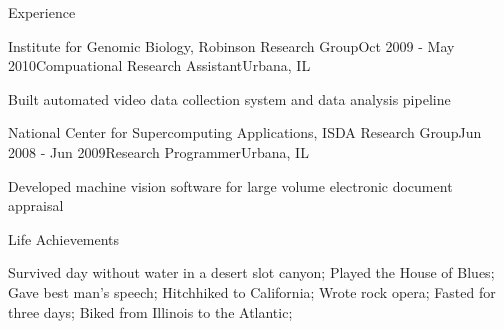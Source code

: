 \documentclass{resume} %
\begin{document}
\begin{rSection}{Experience}

\begin{rSubsection}{Institute for Genomic Biology, Robinson Research Group}{Oct 2009 - May 2010}{Compuational Research Assistant}{Urbana, IL}
\item Built automated video data collection system and data analysis pipeline

\end{rSubsection}


\begin{rSubsection}{National Center for Supercomputing Applications, ISDA Research Group}{Jun 2008 - Jun 2009}{Research Programmer}{Urbana, IL}
\item Developed machine vision software for large volume electronic document appraisal

\end{rSubsection}




\end{rSection}



\begin{rSection}{Life Achievements}
	
	Survived day without water in a desert slot canyon;
	Played the House of Blues;
	Gave best man's speech;
	Hitchhiked to California;
	Wrote rock opera;
	Fasted for three days;
	Biked from Illinois to the Atlantic;
			
\end{rSection}

\end{document}
